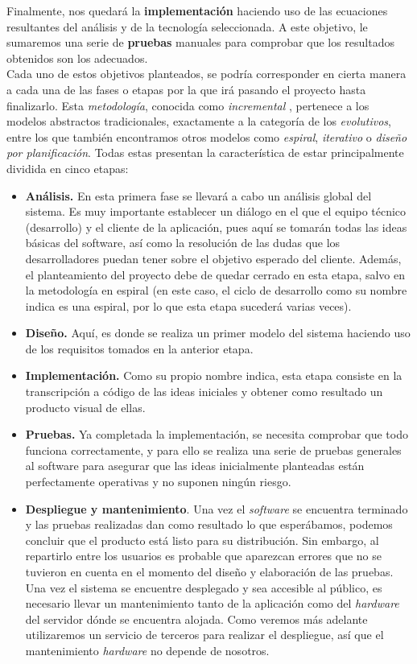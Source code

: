 \documentclass[../main.tex]{subfiles}
\begin{document}
Finalmente, nos quedará la \textbf{implementación} haciendo uso de las ecuaciones resultantes del análisis y de la tecnología seleccionada. A este objetivo, le sumaremos una serie de \textbf{pruebas} manuales para comprobar que los resultados obtenidos son los adecuados.\\

Cada uno de estos objetivos planteados, se podría corresponder en cierta manera a cada una de las fases o etapas por la que irá pasando el proyecto hasta finalizarlo. Esta \textit{metodología}, conocida como \textit{incremental} \cite{metodologiasSoftware}, pertenece a los modelos abstractos tradicionales, exactamente a la categoría de los \textit{evolutivos}, entre los que también encontramos otros modelos como \textit{espiral}, \textit{iterativo} o \textit{diseño por planificación}. Todas estas presentan la característica de estar principalmente dividida en cinco etapas:\\

\begin{itemize}
    \item \textbf{Análisis.} En esta primera fase se llevará a cabo un análisis global del sistema. Es muy importante establecer un diálogo en el que el equipo técnico (desarrollo) y el cliente de la aplicación, pues aquí se tomarán todas las ideas básicas del software, así como la resolución de las dudas que los desarrolladores puedan tener sobre el objetivo esperado del cliente. Además, el planteamiento del proyecto debe de quedar cerrado en esta etapa, salvo en la metodología en espiral (en este caso, el ciclo de desarrollo como su nombre indica es una espiral, por lo que esta etapa sucederá varias veces).
    \item \textbf{Diseño.} \label{software_diseño_etapa} Aquí, es donde se realiza un primer modelo del sistema haciendo uso de los requisitos tomados en la anterior etapa.
    \item \textbf{Implementación.} Como su propio nombre indica, esta etapa consiste en la transcripción a código de las ideas iniciales y obtener como resultado un producto visual de ellas.
    \item \textbf{Pruebas.} Ya completada la implementación, se necesita comprobar que todo funciona correctamente, y para ello se realiza una serie de pruebas generales al software para asegurar que las ideas inicialmente planteadas están perfectamente operativas y no suponen ningún riesgo.
    \item \textbf{Despliegue y mantenimiento}. Una vez el \textit{software} se encuentra terminado y las pruebas realizadas dan como resultado lo que esperábamos, podemos concluir que el producto está listo para su distribución. Sin embargo, al repartirlo entre los usuarios es probable que aparezcan errores que no se tuvieron en cuenta en el momento del diseño y elaboración de las pruebas. Una vez el sistema se encuentre desplegado y sea accesible al público, es necesario llevar un mantenimiento tanto de la aplicación como del \textit{hardware} del servidor dónde se encuentra alojada. Como veremos más adelante utilizaremos un servicio de terceros para realizar el despliegue, así que el mantenimiento \textit{hardware} no depende de nosotros.
\end{itemize}
\end{document}
